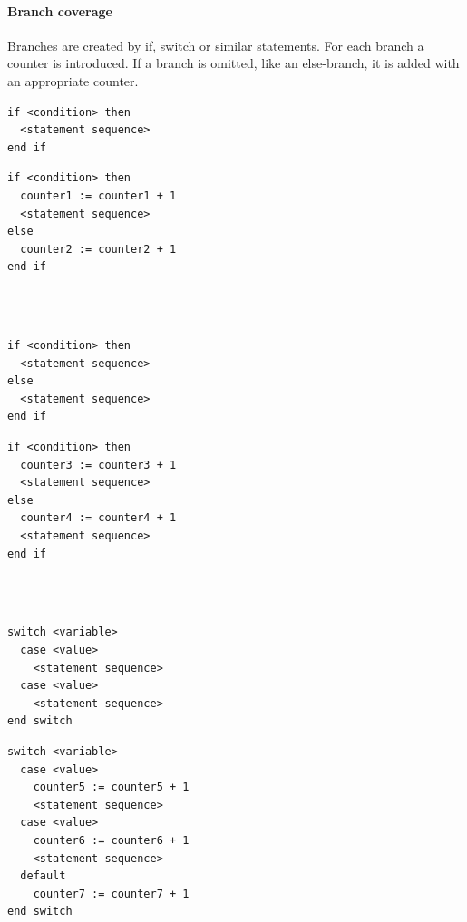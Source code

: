 \paragraph{Branch coverage}
Branches are created by if, switch or similar statements. For each branch a counter is introduced. If a branch is omitted, like an else-branch, it is added with an appropriate counter. 
\newline\\
\begin{minipage}[t]{0.5\textwidth}
\begin{verbatim}
if <condition> then
  <statement sequence>
end if
\end{verbatim}
\end{minipage}
\begin{minipage}[t]{0.5\textwidth}
\begin{verbatim}
if <condition> then
  counter1 := counter1 + 1
  <statement sequence>
else
  counter2 := counter2 + 1
end if
\end{verbatim}
\end{minipage}
\newline\\\\
\begin{minipage}[t]{0.5\textwidth}
\begin{verbatim}
if <condition> then
  <statement sequence>
else
  <statement sequence>
end if
\end{verbatim}
\end{minipage}
\begin{minipage}[t]{0.5\textwidth}
\begin{verbatim}
if <condition> then
  counter3 := counter3 + 1
  <statement sequence>
else
  counter4 := counter4 + 1
  <statement sequence>
end if
\end{verbatim}
\end{minipage}
\newline\\\\
\begin{minipage}[t]{0.5\textwidth}
\begin{verbatim}
switch <variable>
  case <value> 
    <statement sequence>
  case <value> 
    <statement sequence>
end switch
\end{verbatim}
\end{minipage}
\begin{minipage}[t]{0.5\textwidth}
\begin{verbatim}
switch <variable>
  case <value> 
    counter5 := counter5 + 1
    <statement sequence>
  case <value> 
    counter6 := counter6 + 1
    <statement sequence>
  default
    counter7 := counter7 + 1
end switch
\end{verbatim}
\end{minipage}
